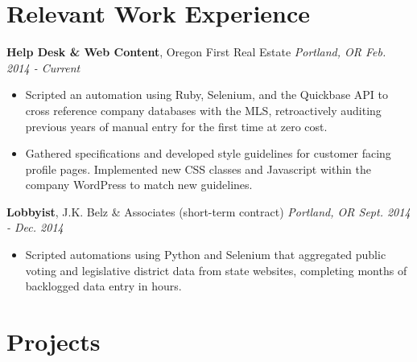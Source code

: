\documentclass[11pt,line,centered]{res}
\begin{document}
\address{\tiny ddykes2@gmail.com | 971-238-4828 | github.com/rsq2}

\begin{resume}
\bigskip

\section{\sectionfont\normalsize Relevant Work Experience}
    \vspace{1em}

    \footnotesize{\bfseries Help Desk \& Web Content}, Oregon First Real Estate \hfill \textit{Portland, OR Feb. 2014 - Current}\\
        \vspace{-8mm}
        \begin{itemize}
            \setlength\itemsep{-1em}
            \item Scripted an automation using Ruby, Selenium, and the Quickbase API to cross reference company databases with the MLS,
                  retroactively auditing previous years of manual entry for the first time at zero cost.\\
            \item Gathered specifications and developed style guidelines for customer facing profile pages. Implemented new CSS classes
                  and Javascript within the company WordPress to match new guidelines.\\
        \end{itemize}
        \vspace{-2\topsep}

    \footnotesize{\bfseries Lobbyist}, J.K. Belz \& Associates (short-term contract) \hfill \textit{Portland, OR Sept. 2014 - Dec. 2014}\\
        \vspace{-8mm}
        \begin{itemize}
            \setlength\itemsep{-1em}
            \item Scripted automations using Python and Selenium that aggregated public voting and legislative district data from state
                  websites, completing months of backlogged data entry in hours. \\
        \end{itemize}

\section{\sectionfont\normalsize Projects}
    \vspace{1em}


\end{resume}
\end{document}
